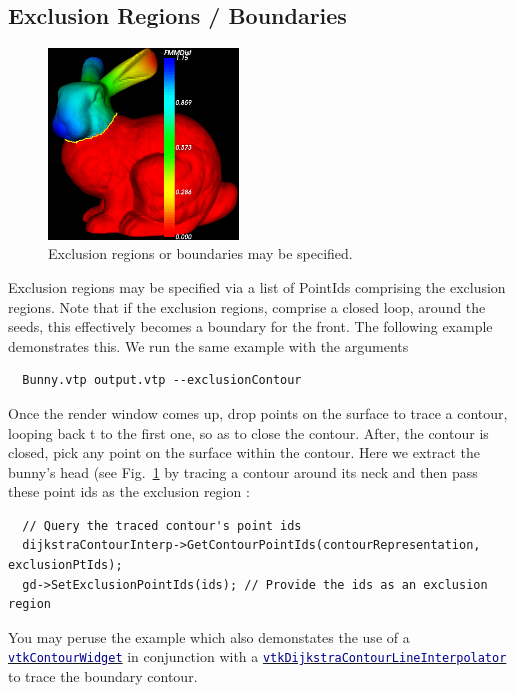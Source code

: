 \documentclass{InsightArticle}
\def\vtk#1{\href{www.vtk.org/doc/nightly/html/class#1.html}{\small\textcolor{darkblue}{\texttt{#1}}}}
\begin{document}
\subsection{Exclusion Regions / Boundaries}
\begin{figure}
  \centering
  \includegraphics[width=0.45\textwidth]{BunnyGeodesicExclusionRegion}
  \caption{Exclusion regions or boundaries may be specified.}
  \label{fig:BunnyGeodesicExclusionRegion}
\end{figure}
Exclusion regions may be specified via a list of PointIds comprising the exclusion regions.
Note that if the exclusion regions, comprise a closed loop, around the seeds, this effectively becomes a boundary for the front. The following example demonstrates this. We run the same example with the arguments
\begin{lstlisting}
  Bunny.vtp output.vtp --exclusionContour
\end{lstlisting}
Once the render window comes up, drop points on the surface to trace a contour, looping back t to the first one, so as to close the contour.
After, the contour is closed, pick any point on the surface within the contour.
Here we extract the bunny's head (see Fig.~\ref{fig:BunnyGeodesicExclusionRegion} by tracing a contour around its neck and then pass these point ids as the exclusion region :
\begin{lstlisting}
  // Query the traced contour's point ids
  dijkstraContourInterp->GetContourPointIds(contourRepresentation, exclusionPtIds);
  gd->SetExclusionPointIds(ids); // Provide the ids as an exclusion region
\end{lstlisting}
You may peruse the example which also demonstates the use of a \vtk{vtkContourWidget} in conjunction with a \vtk{vtkDijkstraContourLineInterpolator} to trace the boundary contour.
\end{document}
